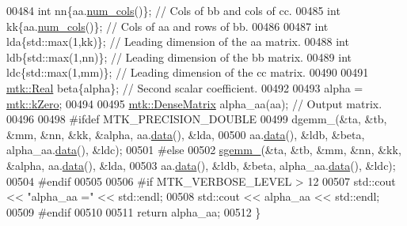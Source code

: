 \begin{DoxyCode}
00484   \textcolor{keywordtype}{int} nn\{aa.\hyperlink{classmtk_1_1DenseMatrix_a41747502d468c6728a4be31501b16e0e}{num\_cols}()\};  \textcolor{comment}{// Cols of bb and cols of cc.}
00485   \textcolor{keywordtype}{int} kk\{aa.\hyperlink{classmtk_1_1DenseMatrix_a41747502d468c6728a4be31501b16e0e}{num\_cols}()\};  \textcolor{comment}{// Cols of aa and rows of bb.}
00486 
00487   \textcolor{keywordtype}{int} lda\{std::max(1,kk)\};  \textcolor{comment}{// Leading dimension of the aa matrix.}
00488   \textcolor{keywordtype}{int} ldb\{std::max(1,nn)\};  \textcolor{comment}{// Leading dimension of the bb matrix.}
00489   \textcolor{keywordtype}{int} ldc\{std::max(1,mm)\};  \textcolor{comment}{// Leading dimension of the cc matrix.}
00490 
00491   \hyperlink{group__c01-roots_gac080bbbf5cbb5502c9f00405f894857d}{mtk::Real} beta\{alpha\}; \textcolor{comment}{// Second scalar coefficient.}
00492 
00493   alpha = \hyperlink{group__c01-roots_ga59a451a5fae30d59649bcda274fea271}{mtk::kZero};
00494 
00495   \hyperlink{classmtk_1_1DenseMatrix}{mtk::DenseMatrix} alpha\_aa(aa); \textcolor{comment}{// Output matrix.}
00496 
00498 \textcolor{preprocessor}{  #ifdef MTK\_PRECISION\_DOUBLE}
00499   dgemm\_(&ta, &tb, &mm, &nn, &kk, &alpha, aa.\hyperlink{classmtk_1_1DenseMatrix_a0c33b8a9e01d157c61ddbdf807c25d84}{data}(), &lda,
00500          aa.\hyperlink{classmtk_1_1DenseMatrix_a0c33b8a9e01d157c61ddbdf807c25d84}{data}(), &ldb, &beta, alpha\_aa.\hyperlink{classmtk_1_1DenseMatrix_a0c33b8a9e01d157c61ddbdf807c25d84}{data}(), &ldc);
00501 \textcolor{preprocessor}{  #else}
00502   \hyperlink{namespacemtk_adb7c0560326b8e57f255e58b87ec76b0}{sgemm\_}(&ta, &tb, &mm, &nn, &kk, &alpha, aa.\hyperlink{classmtk_1_1DenseMatrix_a0c33b8a9e01d157c61ddbdf807c25d84}{data}(), &lda,
00503          aa.\hyperlink{classmtk_1_1DenseMatrix_a0c33b8a9e01d157c61ddbdf807c25d84}{data}(), &ldb, &beta, alpha\_aa.\hyperlink{classmtk_1_1DenseMatrix_a0c33b8a9e01d157c61ddbdf807c25d84}{data}(), &ldc);
00504 \textcolor{preprocessor}{  #endif}
00505 
00506 \textcolor{preprocessor}{  #if MTK\_VERBOSE\_LEVEL > 12}
00507   std::cout << \textcolor{stringliteral}{"alpha\_aa ="} << std::endl;
00508   std::cout << alpha\_aa << std::endl;
00509 \textcolor{preprocessor}{  #endif}
00510 
00511   \textcolor{keywordflow}{return} alpha\_aa;
00512 \}
\end{DoxyCode}
